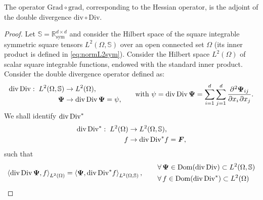 \begin{theorem}
	The operator $\mathrm{Grad} \circ \mathrm{grad}$, corresponding to the Hessian operator, is the adjoint of the double divergence $\mathrm{div} \circ \mathrm{Div}$.
	\begin{proof}
		Let $\mathbb{S} = \mathbb{R}^{d \times d}_{\text{sym}}$ and consider the Hilbert space of the square integrable symmetric square tensors  $L^2(\Omega, \mathbb{S})$ over an open connected set $\Omega$ (its inner product is defined in \eqref{eq:normL2sym}). 		Consider the Hilbert space $L^2(\Omega)$ of scalar square integrable functions, endowed with the standard inner product. Consider the double divergence operator defined as: 
		\begin{equation*}
		\begin{aligned}
		\div\Div: \; L^2(\Omega, \mathbb{S})& \rightarrow L^2(\Omega), \\
		\bm{\Psi}& \rightarrow \div\Div \bm{\Psi} = \psi, \\	\end{aligned}
		\qquad \text{with } \psi = \div\Div \bm{\Psi} = \sum_{i = 1}^d \sum_{j = 1}^d \diffp{\bm{\Psi}_{ij}}{x_i,x_j}.
		\end{equation*}
		We {shall} identify ${\operatorname{div}\operatorname*{Div}}^*$
		\begin{equation*}
		\begin{aligned}
		{\operatorname{div}\operatorname*{Div}}^*: \; L^2(\Omega)& \rightarrow L^2(\Omega, \mathbb{S}), \\
		f& \rightarrow  {\operatorname{div}\operatorname*{Div}}^* f = \bm{F}, \\
		\end{aligned}
		\end{equation*}
		such that 
		\begin{equation*}
		\left\langle \operatorname{div}\operatorname*{Div} \bm{\Psi} , f \right\rangle_{L^2(\Omega)} = \left\langle \bm{\Psi} , {\operatorname{div}\operatorname*{Div}}^* f \right\rangle_{L^2(\Omega, \mathbb{S})},
		\begin{aligned} \qquad
		&\forall \,\bm{\Psi} \in \operatorname{Dom}(\operatorname{div}\operatorname*{Div}) \subset L^2(\Omega, \mathbb{S}) \\
		&\forall \,f \in \operatorname{Dom}({\operatorname{div}\operatorname*{Div}}^*) \subset L^2(\Omega)
		\end{aligned}
		\end{equation*}
		

\end{proof}
\end{theorem}
